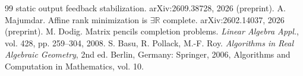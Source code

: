 \documentclass[journal]{IEEEtran}
\theoremstyle{plainn}
\theoremstyle{remark}
\begin{document}
\begin{thebibliography}{99}
  static output feedback stabilization. arXiv:2609.38728, 2026 (preprint).
 A. Majumdar. Affine rank minimization is
  $\exists\mathbb{R}$ complete. arXiv:2602.14037, 2026 (preprint).
 M. Dodig. Matrix pencils completion problems.
  \emph{Linear Algebra Appl.}, vol. 428, pp. 259--304, 2008.
 S. Basu, R. Pollack, M.-F. Roy. \emph{Algorithms in Real
  Algebraic Geometry}, 2nd ed. Berlin, Germany: Springer, 2006,
  Algorithms and Computation in Mathematics, vol. 10.
\end{thebibliography}
\end{document}
